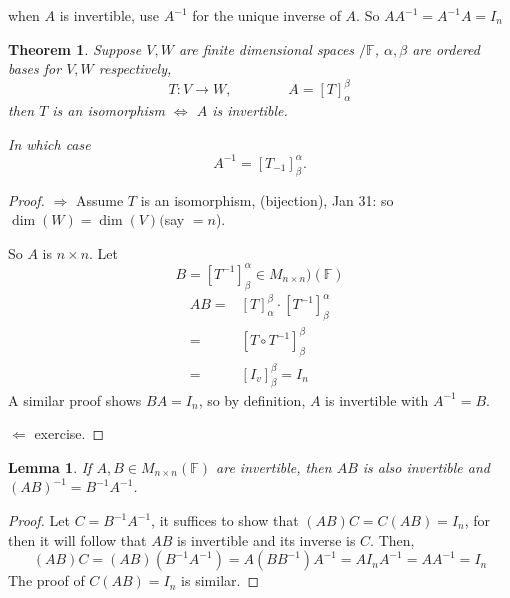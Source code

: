 \documentclass[12pt]{article}
\theoremstyle{plain}
\newtheorem{theorem}{Theorem}[subsection]
\newtheorem{lemma}{Lemma}[subsection]
\newcommand{\mF}{{\mathbb{F}}}
\begin{document}
	when $A$ is invertible, use $A^{-1}$ for the unique inverse of $A$. So 
	$AA^{-1} = A^{-1}A = I_n$

	\begin{theorem}
		Suppose $V, W$ are finite dimensional spaces $/\mF$, $\alpha, \beta$
		are ordered bases for $V, W$ respectively, 
		\[
			T:V\to W, \qquad \qquad A = [T]_{\alpha}^{\beta}
		\]
		then $T$ is an isomorphism $\iff$ $A$ is invertible. 

		In which case
		\[
			A^{-1} = [T_{-1}]_{\beta}^{\alpha}. 
		\]
	\end{theorem}
	\begin{proof}
		$\Rightarrow$ Assume $T$ is an isomorphism, (bijection), 
		Jan 31: so $\dim (W) = \dim(V)($say $= n$). 

		So $A$ is $n\times n$.
		Let 
		\[
			B = [T^{-1}]_{\beta}^{\alpha} \in M_{n\times n})(\mF)
		\]
		\begin{align*}
			AB =& [T]_{\alpha}^{\beta}\cdot [T^{-1}]_{\beta}^{\alpha}\\
			=& [T\circ T^{-1}]_{\beta}^{\beta} \tag{By Monday's Theorem}\\
			=& [I_v]_{\beta}^{\beta} 
			=I_n
		\end{align*}
		A similar proof shows $BA = I_n$, so by definition, $A$ is invertible
		with $A^{-1} = B$. 

		$\Leftarrow$ exercise. 
	\end{proof}

	\begin{lemma}
		If $A,B \in M_{n\times n}(\mF)$ are invertible, then $AB$ is also 
		invertible and $(AB)^{-1} = B^{-1}A^{-1}$.  
	\end{lemma}
	\begin{proof}
		Let $C = B^{-1}A^{-1}$, it suffices to show that $(AB)C = C(AB) = I_n$,
		for then it will follow that $AB$ is invertible and its inverse is $C$.
		Then, 
		\[
			(AB)C = (AB)(B^{-1}A^{-1}) = A(BB^{-1})A^{-1} = AI_nA^{-1} = AA^{-1}
			=I_n
		\]
		The proof of $C(AB)=I_n$ is similar. 
	\end{proof}




\end{document}
